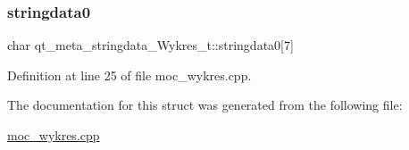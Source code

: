 \mbox{\label{structqt__meta__stringdata___wykres__t_a3776371d795a32f5ac62a6eff3e1b435}} 
\subsubsection{\texorpdfstring{stringdata0}{stringdata0}}
{\footnotesize\ttfamily char qt\+\_\+meta\+\_\+stringdata\+\_\+\+Wykres\+\_\+t\+::stringdata0\mbox{[}7\mbox{]}}



Definition at line 25 of file moc\+\_\+wykres.\+cpp.



The documentation for this struct was generated from the following file\+:\begin{DoxyCompactItemize}
\item 
\hyperlink{moc__wykres_8cpp}{moc\+\_\+wykres.\+cpp}\end{DoxyCompactItemize}
